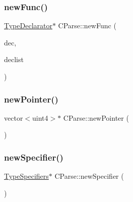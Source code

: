 \mbox{\label{class_c_parse_a9f32a2400060cd74285c5af4bcc4d490}} 
\subsubsection{\texorpdfstring{newFunc()}{newFunc()}}
{\footnotesize\ttfamily \mbox{\hyperlink{class_type_declarator}{Type\+Declarator}}$\ast$ C\+Parse\+::new\+Func (\begin{DoxyParamCaption}\item[{\mbox{\hyperlink{class_type_declarator}{Type\+Declarator}} $\ast$}]{dec,  }\item[{vector$<$ \mbox{\hyperlink{class_type_declarator}{Type\+Declarator}} $\ast$ $>$ $\ast$}]{declist }\end{DoxyParamCaption})}

\mbox{\label{class_c_parse_aac29953596c1ce1c3ea97fb4d4fc6cab}} 
\subsubsection{\texorpdfstring{newPointer()}{newPointer()}}
{\footnotesize\ttfamily vector$<$uint4$>$$\ast$ C\+Parse\+::new\+Pointer (\begin{DoxyParamCaption}\item[{void}]{ }\end{DoxyParamCaption})}

\mbox{\label{class_c_parse_aa5639dc6bf599f11fafe7f0046a0ea59}} 
\subsubsection{\texorpdfstring{newSpecifier()}{newSpecifier()}}
{\footnotesize\ttfamily \mbox{\hyperlink{struct_type_specifiers}{Type\+Specifiers}}$\ast$ C\+Parse\+::new\+Specifier (\begin{DoxyParamCaption}\item[{void}]{ }\end{DoxyParamCaption})}

\mbox{\label{class_c_parse_a035ba6fa550e4a125b30689fef795208}} 
